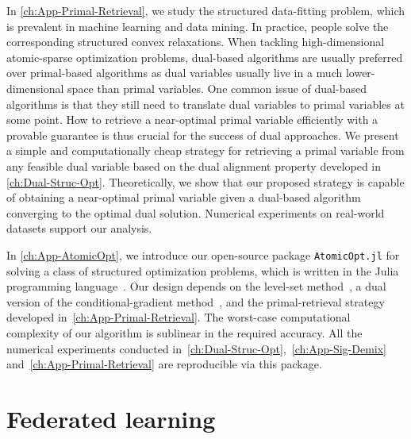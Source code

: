 In \autoref{ch:App-Primal-Retrieval}, we study the structured data-fitting problem, which is prevalent in machine learning and data mining. In practice, people solve the corresponding structured convex relaxations. When tackling high-dimensional atomic-sparse optimization problems, dual-based algorithms are usually preferred over primal-based algorithms as dual variables usually live in a much lower-dimensional space than primal variables. One common issue of dual-based algorithms is that they still need to translate dual variables to primal variables at some point. How to retrieve a near-optimal primal variable efficiently with a provable guarantee is thus crucial for the success of dual approaches. We present a simple and computationally cheap strategy for retrieving a primal variable from any feasible dual variable based on the dual alignment property developed in \autoref{ch:Dual-Struc-Opt}. Theoretically, we show that our proposed strategy is capable of obtaining a near-optimal primal variable given a dual-based algorithm converging to the optimal dual solution. Numerical experiments on real-world datasets support our analysis.

In \autoref{ch:App-AtomicOpt}, we introduce our open-source package \texttt{AtomicOpt.jl} for solving a class of structured optimization problems, which is written in the Julia programming language~\citep{bezanson2017julia}. Our design depends on the level-set method~\citep{aravkin2016levelset}, a dual version of the conditional-gradient method~\cite{jaggi2013revisiting,frank1956algorithm,dunn1978conditional}, and the primal-retrieval strategy developed in~\autoref{ch:App-Primal-Retrieval}. The worst-case computational complexity of our algorithm is sublinear in the required accuracy. All the numerical experiments conducted in~\autoref{ch:Dual-Struc-Opt},~\autoref{ch:App-Sig-Demix} and~\autoref{ch:App-Primal-Retrieval} are reproducible via this package. 



 

\section{Federated learning} \label{sec:1-4}

